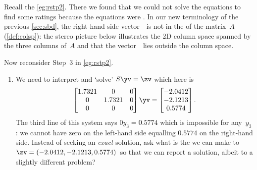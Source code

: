 \begin{example} \label{eg:rstp3}
Recall the   \autoref{eg:rstp2}.
There we found that we could not solve the equations to find some ratings because the equations were .
In our new terminology of the previous \autoref{sec:sbd}, the right-hand side vector~\bv\ is not in the  of the matrix~\(A\) (\autoref{def:colsp}): 
the stereo picture below illustrates the 2D column space spanned by the three columns of~\(A\) and that the vector~\bv\ lies outside the column space.
\begin{center}
\end{center}
Now reconsider Step~3 in  \autoref{eg:rstp2}.
\begin{enumerate} \addtocounter{enumi}2
\item We need to interpret and `solve' \(S\yv=\zv\) which here is
\begin{equation*}
\begin{bmatrix} 1.7321&0&0
\\0&1.7321&0
\\0&0&0 \end{bmatrix}\yv=\begin{bmatrix} 
   -2.0412\\-2.1213\\0.5774
\end{bmatrix}.
\end{equation*}
The third line of this system says \(0y_3=0.5774\) which is impossible for any~\(y_3\): we cannot have zero on the left-hand side equalling \(0.5774\) on the right-hand side.
Instead of seeking an \emph{exact} solution, ask what is the \emph{} we can make to~\(\zv=(-2.0412, -2.1213, 0.5774)\)\ so that we can report a solution, albeit to a slightly different problem?

\end{enumerate}
\end{example}
